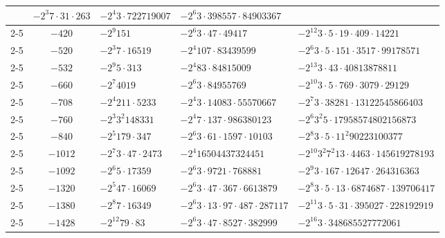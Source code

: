 \documentclass[twoside,10pt]{article}
\begin{document}
\begin{tabular}{cc|l|p{4.5cm}|p{5.25cm}|}
& $-2^{3}7\cdot31\cdot263$ & $-2^{4}3\cdot722719007$ & $-2^{6}3\cdot398557\cdot84903367$\\
\cline{2-5}
\multicolumn{1}{ |c| }{}& \multicolumn{1}{|c|}{$-420$}
& $-2^{9}151$ & $-2^{6}3\cdot47\cdot49417$ & $-2^{12}3\cdot5\cdot19\cdot409\cdot14221$\\
\cline{2-5}
\multicolumn{1}{ |c| }{}& \multicolumn{1}{|c|}{$-520$}
& $-2^{3}7\cdot16519$ & $-2^{4}107\cdot83439599$ & $-2^{6}3\cdot5\cdot151\cdot3517\cdot99178571$\\
\cline{2-5}
\multicolumn{1}{ |c| }{}& \multicolumn{1}{|c|}{$-532$}
& $-2^{9}5\cdot313$ & $-2^{4}83\cdot84815009$ & $-2^{13}3\cdot43\cdot40813878811$\\
\cline{2-5}
\multicolumn{1}{ |c| }{}& \multicolumn{1}{|c|}{$-660$}
& $-2^{7}4019$ & $-2^{6}3\cdot84955769$ & $-2^{10}3\cdot5\cdot769\cdot3079\cdot29129$\\
\cline{2-5}
\multicolumn{1}{ |c| }{}& \multicolumn{1}{|c|}{$-708$}
& $-2^{4}211\cdot5233$ & $-2^{4}3\cdot14083\cdot55570667$ & $-2^{7}3\cdot38281\cdot13122545866403$\\
\cline{2-5}
\multicolumn{1}{ |c| }{}& \multicolumn{1}{|c|}{$-760$}
& $-2^{3}3^{2}148331$ & $-2^{4}7\cdot137\cdot986380123$ & $-2^{6}3^{2}5\cdot17958574802156873$\\
\cline{2-5}
\multicolumn{1}{ |c| }{}& \multicolumn{1}{|c|}{$-840$}
& $-2^{5}179\cdot347$ & $-2^{6}3\cdot61\cdot1597\cdot10103$ & $-2^{8}3\cdot5\cdot11^{2}90223100377$\\
\cline{2-5}
\multicolumn{1}{ |c| }{}& \multicolumn{1}{|c|}{$-1012$}
& $-2^{7}3\cdot47\cdot2473$ & $-2^{4}16504437324451$ & $-2^{10}3^{2}7^{2}13\cdot4463\cdot145619278193$\\
\cline{2-5}
\multicolumn{1}{ |c| }{}& \multicolumn{1}{|c|}{$-1092$}
& $-2^{6}5\cdot17359$ & $-2^{6}3\cdot9721\cdot768881$ & $-2^{9}3\cdot167\cdot12647\cdot264316363$\\
\cline{2-5}
\multicolumn{1}{ |c| }{}& \multicolumn{1}{|c|}{$-1320$}
& $-2^{5}47\cdot16069$ & $-2^{6}3\cdot47\cdot367\cdot6613879$ & $-2^{8}3\cdot5\cdot13\cdot6874687\cdot139706417$\\
\cline{2-5}
\multicolumn{1}{ |c| }{}& \multicolumn{1}{|c|}{$-1380$}
& $-2^{8}7\cdot16349$ & $-2^{6}3\cdot13\cdot97\cdot487\cdot287117$ & $-2^{11}3\cdot5\cdot31\cdot395027\cdot228192919$\\
\cline{2-5}
\multicolumn{1}{ |c| }{}& \multicolumn{1}{|c|}{$-1428$}
& $-2^{12}79\cdot83$ & $-2^{6}3\cdot47\cdot8527\cdot382999$ & $-2^{16}3\cdot348685527772061$\\

\end{tabular}
\end{document}
